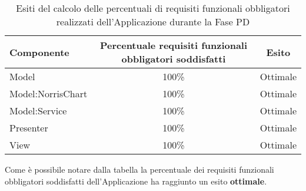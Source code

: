 					\begin{table}[H]
						\centering
							\begin{tabu}{| l | c | c |}
								\hline
								Componente	& Percentuale requisiti funzionali obbligatori soddisfatti	& Esito		\\ \hline \hline
								Model				&   100\% 	& Ottimale \\ \hline
								Model:NorrisChart	&   100\% 	& Ottimale  \\ \hline
								Model:Service 		& 	100\%	& Ottimale   \\ \hline
								Presenter  			& 	100\%	& Ottimale  \\ \hline
								View  				& 	100\%	& Ottimale  \\ \hline
							\end{tabu}
						\caption{Esiti del calcolo delle percentuali di requisiti funzionali obbligatori realizzati dell'Applicazione durante la Fase PD}
					\end{table}
					Come è possibile notare dalla tabella la percentuale dei requisiti funzionali obbligatori soddisfatti dell'Applicazione ha raggiunto un esito \textbf{ottimale}.


